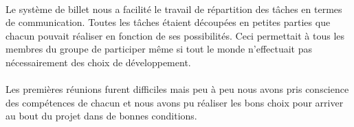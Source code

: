 \paragraph{}

Le système de billet nous a facilité le travail de répartition des tâches en termes de communication. Toutes les tâches étaient découpées en petites parties que chacun pouvait réaliser en fonction de ses possibilités. Ceci permettait à tous les membres du groupe de participer même si tout le monde n’effectuait pas nécessairement des choix de développement.
\paragraph{}

Les premières réunions furent difficiles mais peu à peu nous avons pris conscience des compétences de chacun et nous avons pu réaliser les bons choix pour arriver au bout du projet dans de bonnes conditions.



